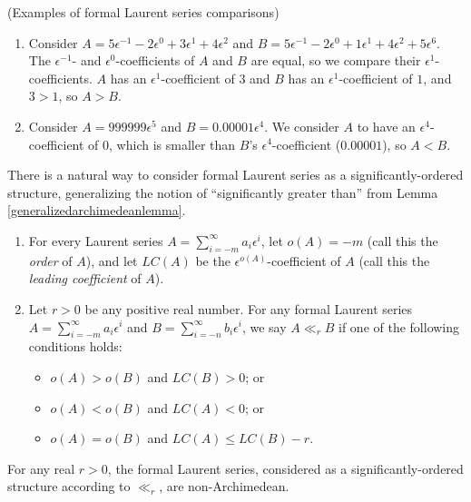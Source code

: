\documentclass[twoside,11pt]{article}
\begin{document}
\begin{example}
(Examples of formal Laurent series comparisons)
\begin{enumerate}
    \item Consider $A=5\epsilon^{-1}-2\epsilon^{0}+3\epsilon^1+4\epsilon^2$ and
    $B=5\epsilon^{-1}-2\epsilon^0+1\epsilon^1+4\epsilon^2+5\epsilon^6$.
    The $\epsilon^{-1}$- and $\epsilon^0$-coefficients of $A$ and $B$ are equal, so
    we compare their $\epsilon^1$-coefficients. $A$ has an $\epsilon^1$-coefficient of $3$ and
    $B$ has an $\epsilon^1$-coefficient of $1$, and $3>1$, so $A>B$.
    \item Consider $A=999999\epsilon^5$ and $B=0.00001\epsilon^{4}$.
    We consider $A$ to have an $\epsilon^{4}$-coefficient of $0$, which is smaller than
    $B$'s $\epsilon^{4}$-coefficient ($0.00001$), so $A<B$.
\end{enumerate}
\end{example}

There is a natural way to consider formal Laurent series as a significantly-ordered
structure, generalizing the notion of ``significantly greater than'' from
Lemma \ref{generalizedarchimedeanlemma}.

\begin{definition}
\label{significantorderednessoflaurent}
\begin{enumerate}
\item
For every Laurent series $A=\sum_{i=-m}^\infty a_i\epsilon^i$, let $o(A)=-m$ (call this the
\emph{order} of $A$), and let $LC(A)$ be the $\epsilon^{o(A)}$-coefficient of $A$ (call
this the \emph{leading coefficient} of $A$).
\item
Let $r>0$ be any positive real number.
For any formal Laurent series $A=\sum_{i=-m}^\infty a_i\epsilon^i$
and $B=\sum_{i=-n}^\infty b_i\epsilon^i$,
we say $A\ll_r B$ if one of the following conditions holds:
    \begin{itemize}
        \item
        $o(A)>o(B)$ and $LC(B)>0$; or
        \item
        $o(A)<o(B)$ and $LC(A)<0$; or
        \item
        $o(A)=o(B)$ and $LC(A)\leq LC(B)-r$.
    \end{itemize}
\end{enumerate}
\end{definition}

\begin{lemma}
For any real $r>0$, the formal Laurent series, considered as a significantly-ordered
structure according to $\ll_r$, are non-Archimedean.
\end{lemma}
\end{document}
